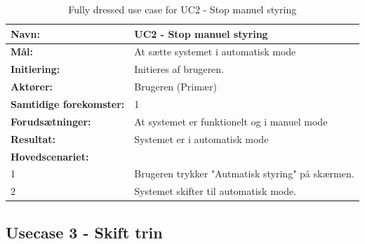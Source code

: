 \begin{table}[H]
	\centering
	
	\begin{threeparttable}
		\begin{tabularx}{\linewidth}{ l X }
			\toprule
			\bfseries{Navn:}				& UC2 - Stop manuel styring  \\
			\midrule
			\bfseries{Mål:} 				& At sætte systemet i automatisk mode \\
			\midrule
			\bfseries{Initiering:} 			& Initieres af brugeren. \\
			\midrule
			\bfseries{Aktører:} 			& Brugeren (Primær) \\
			\midrule
			\bfseries{Samtidige forekomster:} & 1 \\
			\midrule
			\bfseries{Forudsætninger:} 		& At systemet er funktionelt og i manuel mode\\
			\midrule
			\bfseries{Resultat:} 			& Systemet er i automatisk mode \\
			\midrule
			\bfseries{Hovedscenariet:} 	& \\
			
			
			1 	& Brugeren trykker "Autmatisk styring" på skærmen.\\
			2 	& Systemet skifter til automatisk mode.\\		
				
			
			\bottomrule
			
		\end{tabularx}
	\end{threeparttable}
	\caption{Fully dressed use case for UC2 - Stop manuel styring}
	\label{table:UC2}
\end{table}

\subsection{Usecase 3 - Skift trin}

